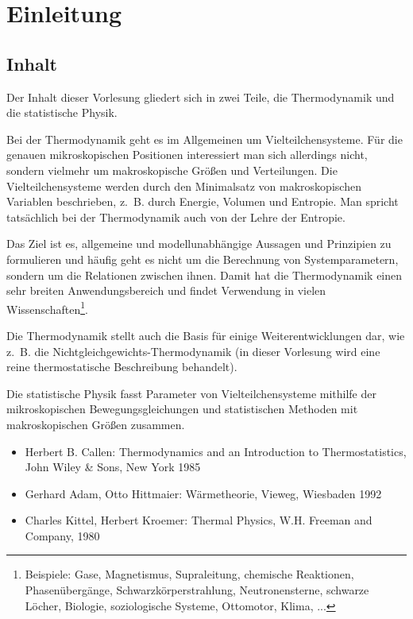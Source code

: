 
\chapter*{Einleitung\label{einleitung}}


\section*{Inhalt}

Der Inhalt dieser Vorlesung gliedert sich in zwei Teile, die Thermodynamik und die statistische Physik.

Bei der Thermodynamik geht es im Allgemeinen um Vielteilchensysteme. Für die genauen mikroskopischen Positionen interessiert man sich allerdings nicht, sondern vielmehr um makroskopische Größen und Verteilungen.
Die Vielteilchensysteme werden durch den Minimalsatz von makroskopischen Variablen beschrieben, z.~B. durch Energie, Volumen und Entropie.
Man spricht tatsächlich bei der Thermodynamik auch von der Lehre der Entropie.

Das Ziel ist es, allgemeine und modellunabhängige Aussagen und Prinzipien zu formulieren und häufig geht es nicht um die Berechnung von Systemparametern, sondern um die Relationen zwischen ihnen.
Damit hat die Thermodynamik einen sehr breiten Anwendungsbereich und findet Verwendung in vielen 
Wissenschaften\footnote{Beispiele: Gase, Magnetismus, Supraleitung, chemische Reaktionen, Phasenübergänge, Schwarzkörperstrahlung, Neutronensterne, schwarze Löcher, Biologie, soziologische Systeme, Ottomotor, Klima, ...}.

Die Thermodynamik stellt auch die Basis für einige Weiterentwicklungen dar, wie z.~B. die Nichtgleich\-gewichts-Thermodynamik (in dieser Vorlesung wird eine reine thermostatische Beschreibung behandelt).

Die statistische Physik fasst Parameter von Vielteilchensysteme mithilfe der mikroskopischen Bewegungsgleichungen und statistischen Methoden mit makroskopischen Größen zusammen.



\begin{itemize}
	\item Herbert B. Callen: Thermodynamics and an Introduction to Thermostatistics, John Wiley \& Sons, New York 1985
	\item Gerhard Adam, Otto Hittmaier: Wärmetheorie, Vieweg, Wiesbaden 1992
	\item Charles Kittel, Herbert Kroemer: Thermal Physics, W.H. Freeman and Company, 1980
\end{itemize}

